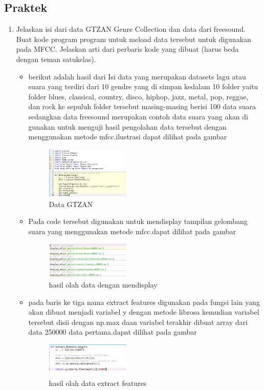     \subsection{Praktek}
        \begin{enumerate}
        \item Jelaskan isi dari data GTZAN Genre Collection dan data dari freesound. Buat kode program program untuk meload data tersebut untuk digunakan pada MFCC. Jelaskan arti dari perbaris kode yang dibuat (harus beda dengan teman satukelas).
        \begin{itemize}
        \item berikut adalah hasil dari Isi data yang merupakan datasets lagu atau suara yang terdiri dari 10 gendre yang di simpan kedalam 10 folder yaitu folder blues, classical, country, disco, hiphop, jazz, metal, pop, reggae, dan rock ke sepuluh folder tersebut masing-masing  berisi 100 data suara sedangkan data freesound merupakan contoh data suara yang akan di gunakan untuk menguji hasil pengolahan data tersebut dengan menggunakan metode mfcc.ilustrasi dapat dilihat pada gambar
        \begin{figure}[H]
            \includegraphics[width=4cm]{figures/1174039/chapter6/1.jpg}
            \centering
            \caption{Data GTZAN}
        \end{figure}
        
        \item Pada code tersebut digunakan untuk mendisplay tampilan gelombang suara yang menggunakan metode mfcc.dapat dilihat pada gambar
        \begin{figure}[H]
            \includegraphics[width=4cm]{figures/1174039/chapter6/2.jpg}
            \centering
            \caption{hasil olah data dengan mendisplay}
        \end{figure}
        
        \item pada baris ke tiga nama extract features digunakan pada fungsi lain yang akan dibuat menjadi variabel y dengan metode librosa kemudian variabel tersebut disii dengan np.max daan variabel terakhir dibuat array dari data 250000 data pertama.dapat dilihat pada gambar
        \begin{figure}[H]
            \includegraphics[width=4cm]{figures/1174039/chapter6/3.jpg}
            \centering
            \caption{hasil olah data extract features}
        \end{figure}
        

\end{itemize}
\end{enumerate}
